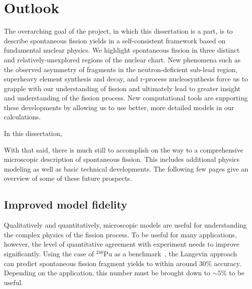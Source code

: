 \chapter{Outlook}\label{chap:Outlook}

The overarching goal of the project, in which this dissertation is a part, is to describe spontaneous fission yields in a self-consistent framework based on fundamental nuclear physics. We highlight spontaneous fission in three distinct and relatively-unexplored regions of the nuclear chart. New phenomena such as the observed asymmetry of fragments in the neutron-deficient sub-lead region, superheavy element synthesis and decay, and r-process nucleosynthesis force us to grapple with our understanding of fission and ultimately lead to greater insight and understanding of the fission process. New computational tools are supporting these developments by allowing us to use better, more detailed models in our calculations.

In this dissertation, 

With that said, there is much still to accomplish on the way to a comprehensive microscopic description of spontaneous fission. This includes additional physics modeling as well as basic technical developments. The following few pages give an overview of some of these future prospects.

\section{Improved model fidelity}
Qualitatively and quantitatively, microscopic models are useful for understanding the complex physics of the fission process. To be useful for many applications, however, the level of quantitative agreement with experiment needs to improve significantly. Using the case of $^{240}$Pu as a benchmark~\cite{Sadhukhan2016}, the Langevin approach can predict spontaneous fission fragment yields to within around 30\% accuracy. Depending on the application, this number must be brought down to ${\sim}5\%$ to be useful.


